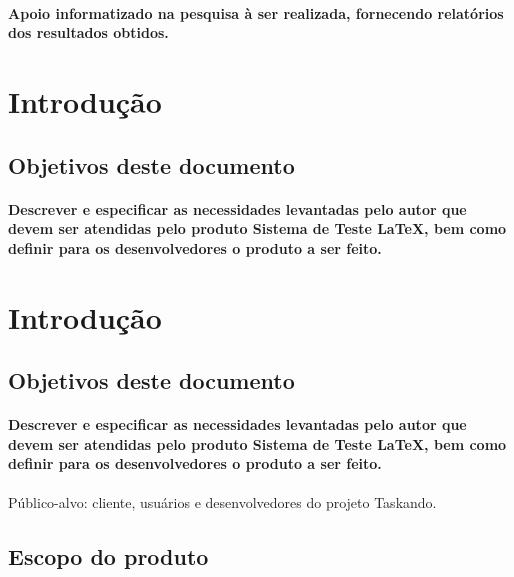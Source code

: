 \documentclass{article}
\begin{document}
			\paragraph{Apoio informatizado na pesquisa à ser realizada, fornecendo relatórios dos resultados obtidos.}
		
	
\newpage

\section{Introdução}
	\subsection{Objetivos deste documento}
		\paragraph{Descrever e especificar as necessidades levantadas pelo autor que devem ser atendidas pelo produto Sistema de Teste LaTeX, bem como definir para os desenvolvedores o produto a ser feito.}


\newpage

\section{Introdução}
	\subsection{Objetivos deste documento}
		\paragraph{Descrever e especificar as necessidades levantadas pelo autor que devem ser atendidas pelo produto Sistema de Teste LaTeX, bem como definir para os desenvolvedores o produto a ser feito.}
\paragraph{}Público-alvo: cliente, usuários e desenvolvedores do projeto Taskando.
	\subsection{Escopo do produto}
\end{document}
